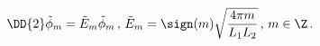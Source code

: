 \begin{equation}
\label{spec-D2-const}
\DD{2} \tilde \phi_m = \tilde E_m \tilde \phi_m \, , \, 
\tilde E_m = \sign(m) \sqrt{\frac{4 \pi m}{L_1 L_2}} \, , \, 
m \in \Z \, .
\end{equation} 
